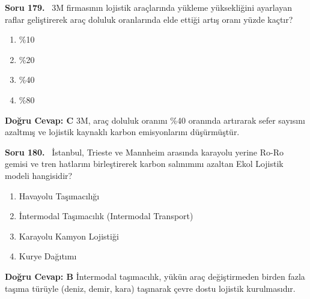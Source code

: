 \documentclass[11pt,a4paper,openany]{book}
\begin{document}
\needspace{5cm}
\vspace{8pt}
\noindent\textbf{\large\sffamily Soru 179.} \ 3M firmasının lojistik araçlarında yükleme yüksekliğini ayarlayan raflar geliştirerek araç doluluk oranlarında elde ettiği artış oranı yüzde kaçtır?
\begin{enumerate}[label=\Alph*), leftmargin=25pt, topsep=4pt, itemsep=2pt]
    \item \%10
    \item \%20
    \item \%40
    \item \%80
\end{enumerate}
\vspace{4pt}
\begin{tcolorbox}[title=Cevap ve Açıklama, colback=gray!3!white, colframe=primarycolor!90!black, arc=2mm, fonttitle=\bfseries\sffamily, top=6pt, bottom=6pt]
    \textbf{Doğru Cevap: C}
    \vspace{2pt}
    3M, araç doluluk oranını \%40 oranında artırarak sefer sayısını azaltmış ve lojistik kaynaklı karbon emisyonlarını düşürmüştür.
\end{tcolorbox}
\vspace{10pt}

\needspace{5cm}
\vspace{8pt}
\noindent\textbf{\large\sffamily Soru 180.} \ İstanbul, Trieste ve Mannheim arasında karayolu yerine Ro-Ro gemisi ve tren hatlarını birleştirerek karbon salınımını azaltan Ekol Lojistik modeli hangisidir?
\begin{enumerate}[label=\Alph*), leftmargin=25pt, topsep=4pt, itemsep=2pt]
    \item Havayolu Taşımacılığı
    \item İntermodal Taşımacılık (Intermodal Transport)
    \item Karayolu Kamyon Lojistiği
    \item Kurye Dağıtımı
\end{enumerate}
\vspace{4pt}
\begin{tcolorbox}[title=Cevap ve Açıklama, colback=gray!3!white, colframe=primarycolor!90!black, arc=2mm, fonttitle=\bfseries\sffamily, top=6pt, bottom=6pt]
    \textbf{Doğru Cevap: B}
    \vspace{2pt}
    İntermodal taşımacılık, yükün araç değiştirmeden birden fazla taşıma türüyle (deniz, demir, kara) taşınarak çevre dostu lojistik kurulmasıdır.
\end{tcolorbox}
\vspace{10pt}
\end{document}
